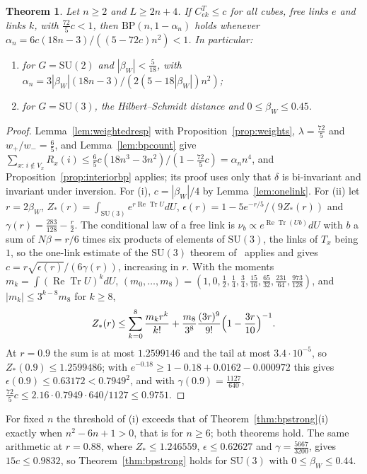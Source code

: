 \documentclass[11pt]{amsart}
\newtheorem{theorem}{Theorem}[section]
\theoremstyle{definition}
\theoremstyle{remark}
\numberwithin{equation}{section}
\newcommand{\SU}{\mathrm{SU}}
\newcommand{\ReTr}{\operatorname{Re}\operatorname{Tr}}
\newcommand{\BP}{\mathrm{BP}}
\begin{document}
\begin{theorem}\label{thm:bpweighted}
Let $n\ge2$ and $L\ge2n+4$. If $C^T_{ek}\le c$ for all cubes, free links $e$
and links $k$, with $\frac{72}5c<1$, then $\BP(n,1-\alpha_n)$ holds whenever
$\alpha_n=6c(18n-3)/((5-72c)n^2)<1$. In particular:
\begin{enumerate}[label=\textup{(\roman*)},leftmargin=*]
\item for $G=\SU(2)$ and $|\beta_W|<\frac5{18}$, with
$\alpha_n=3|\beta_W|(18n-3)/(2(5-18|\beta_W|)n^2)$;
\item for $G=\SU(3)$, the Hilbert--Schmidt distance and $0\le\beta_W\le0.45$.
\end{enumerate}
\end{theorem}

\begin{proof}
Lemma~\ref{lem:weightedresp} with Proposition~\ref{prop:weights},
$\lambda=\frac{72}5$ and $w_+/w_-=\frac65$, and Lemma~\ref{lem:bpcount} give
$\sum_{x:\,i\notin V_x}R_x(i)\le\frac65c(18n^3-3n^2)/(1-\frac{72}5c)=
\alpha_nn^4$, and Proposition~\ref{prop:interiorbp} applies; its proof uses
only that $\delta$ is bi-invariant and invariant under inversion. For (i),
$c=|\beta_W|/4$ by Lemma~\ref{lem:onelink}. For (ii) let $r=2\beta_W$,
$Z_*(r)=\int_{\SU(3)}e^{r\ReTr U}dU$, $\epsilon(r)=1-5e^{-r/5}/(9Z_*(r))$ and
$\gamma(r)=\frac{283}{128}-\frac r2$. The conditional law of a free link is
$\nu_b\propto e^{\ReTr(Ub)}dU$ with $b$ a sum of $N\beta=r/6$ times six
products of elements of $\SU(3)$, the links of $T_x$ being $1$, so the
one-link estimate of the $\SU(3)$ theorem of~\cite{BBLRS26} applies and gives
$c=r\sqrt{\epsilon(r)}/(6\gamma(r))$, increasing in $r$. With the moments
$m_k=\int(\ReTr U)^kdU$, $(m_0,\dots,m_8)=(1,0,\frac12,\frac14,\frac34,
\frac{15}{16},\frac{65}{32},\frac{231}{64},\frac{973}{128})$, and $|m_k|\le
3^{k-8}m_8$ for $k\ge8$,
\[
Z_*(r)\le\sum_{k=0}^8\frac{m_kr^k}{k!}+\frac{m_8}{3^8}\frac{(3r)^9}{9!}
\Bigl(1-\frac{3r}{10}\Bigr)^{-1}.
\]
At $r=0.9$ the sum is at most $1.2599146$ and the tail at most
$3.4\cdot10^{-5}$, so $Z_*(0.9)\le1.2599486$; with $e^{-0.18}\ge1-0.18+0.0162
-0.000972$ this gives $\epsilon(0.9)\le0.63172<0.7949^2$, and with
$\gamma(0.9)=\frac{1127}{640}$, $\frac{72}5c\le2.16\cdot0.7949\cdot640/1127
\le0.9751$.
\end{proof}

For fixed $n$ the threshold of (i) exceeds that of
Theorem~\ref{thm:bpstrong}(i) exactly when $n^2-6n+1>0$, that is for $n\ge6$;
both theorems hold. The same arithmetic at $r=0.88$, where $Z_*\le1.246559$,
$\epsilon\le0.62627$ and $\gamma=\frac{5667}{3200}$, gives $15c\le0.9832$, so
Theorem~\ref{thm:bpstrong} holds for $\SU(3)$ with $0\le\beta_W\le0.44$.
\end{document}

